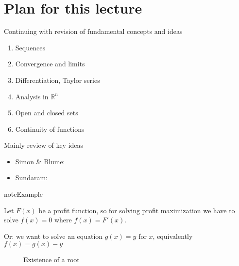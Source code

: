 \documentclass[letterpaper,10pt,english]{jupyterBook}
\begin{document}
\section{Plan for this lecture}
\label{\detokenize{04.basic_analysis:plan-for-this-lecture}}
\sphinxAtStartPar
Continuing with revision of fundamental concepts and ideas
\begin{enumerate}
%
\item {} 
\sphinxAtStartPar
Sequences

\item {} 
\sphinxAtStartPar
Convergence and limits

\item {} 
\sphinxAtStartPar
Differentiation, Taylor series

\item {} 
\sphinxAtStartPar
Analysis in \(\mathbb{R}^n\)

\item {} 
\sphinxAtStartPar
Open and closed sets

\item {} 
\sphinxAtStartPar
Continuity of functions

\end{enumerate}

\sphinxAtStartPar
Mainly review of key ideas

\sphinxAtStartPar
{}
\begin{itemize}
\item {} 
\sphinxAtStartPar
Simon \& Blume:

\item {} 
\sphinxAtStartPar
Sundaram:

\end{itemize}

\begin{sphinxadmonition}{note}{Example}

\sphinxAtStartPar
Let \(F(x)\) be a profit function, so for solving profit maximization we have to solve \(f(x)=0\) where \(f(x)=F'(x)\).

\sphinxAtStartPar
Or: we want to solve an equation \(g(x) = y\) for \(x\), equivalently
\(f(x) = g(x) - y\)
\end{sphinxadmonition}

\begin{figure}[htbp]
\centering
\capstart

\noindent{}
\caption{Existence of a root}\label{\detokenize{04.basic_analysis:root}}\end{figure}
\end{document}
